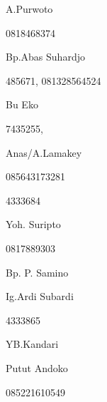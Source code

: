 \documentclass{article}
\begin{document}
\begin{figure}
\centering
\begin{minipage}{2.969cm}
A.Purwoto

0818468374
\end{minipage}
\end{figure}
\begin{figure}
\centering
\begin{minipage}{4.477cm}
Bp.Abas Suhardjo

485671, 081328564524

\end{minipage}
\end{figure}
\begin{figure}
\centering
\begin{minipage}{4.175cm}
Bu Eko

7435255,

\end{minipage}
\end{figure}
\begin{figure}
\centering
\begin{minipage}{3.371cm}
Anas/A.Lamakey

085643173281

4333684
\end{minipage}
\end{figure}
\begin{figure}
\centering
\begin{minipage}{3.17cm}
Yoh. Suripto

0817889303

\end{minipage}
\end{figure}
\begin{figure}
\centering
\begin{minipage}{3.069cm}
Bp. P. Samino
\end{minipage}
\end{figure}
\begin{figure}
\centering
\begin{minipage}{3.17cm}
Ig.Ardi Subardi

4333865
\end{minipage}
\end{figure}
\begin{figure}
\centering
\begin{minipage}{3.17cm}
YB.Kandari

\end{minipage}
\end{figure}
\begin{figure}
\centering
\begin{minipage}{3.27cm}
Putut Andoko

085221610549

\end{minipage}
\end{figure}
\end{document}
